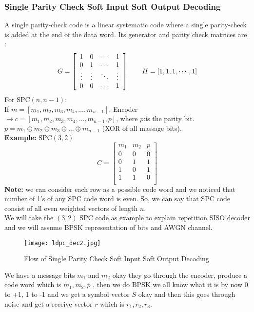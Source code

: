 \subsubsection{Single Parity Check Soft Input Soft Output Decoding}
A single parity-check code is a linear systematic code where a single parity-check is added at the end of the data word. Its generator and parity check matrices are :
\begin{equation*}
    G = \left[ \begin{array}{c c c c}
        1 & 0 & \cdots & 1 \\
        0 & 1 & \cdots & 1 \\
        \vdots & \vdots & \ddots & \vdots \\
        0 & 0 & \cdots & 1
    \end{array} \right] \qquad H = \left[ 1, 1, 1, \cdots, 1 \right]
\end{equation*}
For SPC$(n,n-1)$:\\
If $m=[m_1,m_2,m_3,m_4, \ldots, m_{n-1}]$, Encoder $\rightarrow  c=[ m_1,m_2,m_3,m_4, \ldots, m_{n-1}, p]$, where $p$:is the parity bit. $p = m_1 \oplus m_2 \oplus m_3 \oplus \ldots \oplus m_{n-1}$ (XOR of all massage bits).\\
\textbf{Example:} SPC$(3,2)$
\[C=\left[\begin{matrix}m_1&m_2&p\\0&0&0\\0&1&1\\1&0&1\\1&1&0\\\end{matrix}\right]\]
\textbf{Note:} we can consider each row as a possible code word and we noticed that number of 1's of any SPC code word is even. So, we can say that SPC code consist of all even weighted vectors of length $n$.\\
We will take the $(3, 2)$ SPC code as example to explain repetition SISO decoder and we will assume BPSK representation of bits and AWGN channel.
\begin{figure}[h]
    \centering
    \texttt{[image: ldpc\_dec2.jpg]}
    \caption{Flow of Single Parity Check Soft Input Soft Output Decoding}
    \label{fig:flow of LDPC SPC}
\end{figure}
We have a message bits $m_1$ and $m_2$ okay they go through the encoder, produce a code word which is $m_1 , m_2 , p$ , then we do BPSK we all know what it is by now 0 to +1, 1 to -1 and we get a symbol vector $S$ okay and then this goes through noise and get a receive vector $r$ which is $r_1, r_2, r_3$.\\
